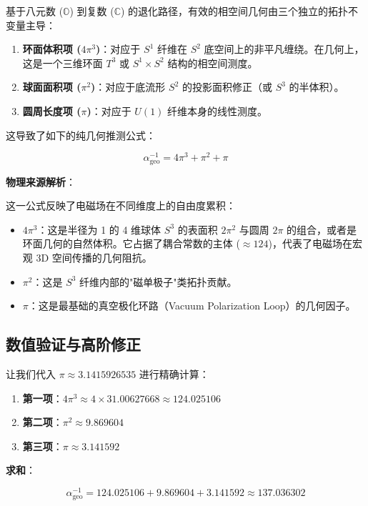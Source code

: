 基于八元数 ($\mathbb{O}$) 到复数 ($\mathbb{C}$) 的退化路径，有效的相空间几何由三个独立的拓扑不变量主导：

\begin{enumerate}
\item \textbf{环面体积项 ($4\pi^3$)}：对应于 $S^1$ 纤维在 $S^2$ 底空间上的非平凡缠绕。在几何上，这是一个三维环面 $T^3$ 或 $S^1 \times S^2$ 结构的相空间测度。
\item \textbf{球面面积项 ($\pi^2$)}：对应于底流形 $S^2$ 的投影面积修正（或 $S^3$ 的半体积）。
\item \textbf{圆周长度项 ($\pi$)}：对应于 $U(1)$ 纤维本身的线性测度。
\end{enumerate}

这导致了如下的纯几何推测公式：

\[\alpha_{\text{geo}}^{-1} = 4\pi^3 + \pi^2 + \pi\]

\textbf{物理来源解析}：

这一公式反映了电磁场在不同维度上的自由度累积：

\begin{itemize}
\item \textbf{$4\pi^3$}：这是半径为 1 的 4 维球体 $S^3$ 的表面积 $2\pi^2$ 与圆周 $2\pi$ 的组合，或者是环面几何的自然体积。它占据了耦合常数的主体 ($\approx 124$)，代表了电磁场在宏观 3D 空间传播的几何阻抗。
\item \textbf{$\pi^2$}：这是 $S^3$ 纤维内部的"磁单极子"类拓扑贡献。
\item \textbf{$\pi$}：这是最基础的真空极化环路（Vacuum Polarization Loop）的几何因子。
\end{itemize}

\subsection{数值验证与高阶修正}

让我们代入 $\pi \approx 3.1415926535$ 进行精确计算：

\begin{enumerate}
\item \textbf{第一项}：$4\pi^3 \approx 4 \times 31.00627668 \approx 124.025106$
\item \textbf{第二项}：$\pi^2 \approx 9.869604$
\item \textbf{第三项}：$\pi \approx 3.141592$
\end{enumerate}

\textbf{求和}：

\[\alpha_{\text{geo}}^{-1} = 124.025106 + 9.869604 + 3.141592 \approx 137.036302\]

